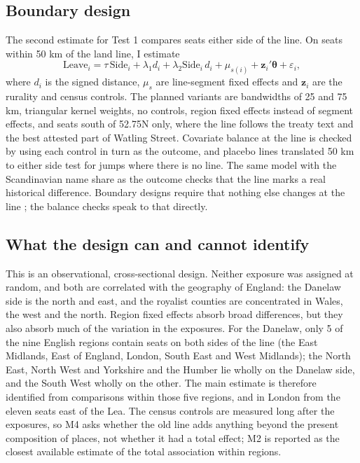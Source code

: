 \documentclass[11pt,a4paper]{article}
\begin{document}
\subsection{Boundary design}
The second estimate for Test 1 compares seats either side of the line. On seats within 50 km of the land line, I estimate
\begin{equation}
\text{Leave}_i = \tau\,\text{Side}_i + \lambda_1 d_i + \lambda_2 \text{Side}_i\, d_i + \mu_{s(i)} + \mathbf{z}_i'\boldsymbol\theta + \varepsilon_i,
\end{equation}
where $d_i$ is the signed distance, $\mu_s$ are line-segment fixed effects and $\mathbf{z}_i$ are the rurality and census controls. The planned variants are bandwidths of 25 and 75 km, triangular kernel weights, no controls, region fixed effects instead of segment effects, and seats south of 52.75\textdegree{}N only, where the line follows the treaty text and the best attested part of Watling Street. Covariate balance at the line is checked by using each control in turn as the outcome, and placebo lines translated 50 km to either side test for jumps where there is no line. The same model with the Scandinavian name share as the outcome checks that the line marks a real historical difference. Boundary designs require that nothing else changes at the line \citep{eggers2015}; the balance checks speak to that directly.

\subsection{What the design can and cannot identify}
This is an observational, cross-sectional design. Neither exposure was assigned at random, and both are correlated with the geography of England: the Danelaw side is the north and east, and the royalist counties are concentrated in Wales, the west and the north. Region fixed effects absorb broad differences, but they also absorb much of the variation in the exposures. For the Danelaw, only 5 of the nine English regions contain seats on both sides of the line (the East Midlands, East of England, London, South East and West Midlands); the North East, North West and Yorkshire and the Humber lie wholly on the Danelaw side, and the South West wholly on the other. The main estimate is therefore identified from comparisons within those five regions, and in London from the eleven seats east of the Lea. The census controls are measured long after the exposures, so M4 asks whether the old line adds anything beyond the present composition of places, not whether it had a total effect; M2 is reported as the closest available estimate of the total association within regions.
\end{document}
